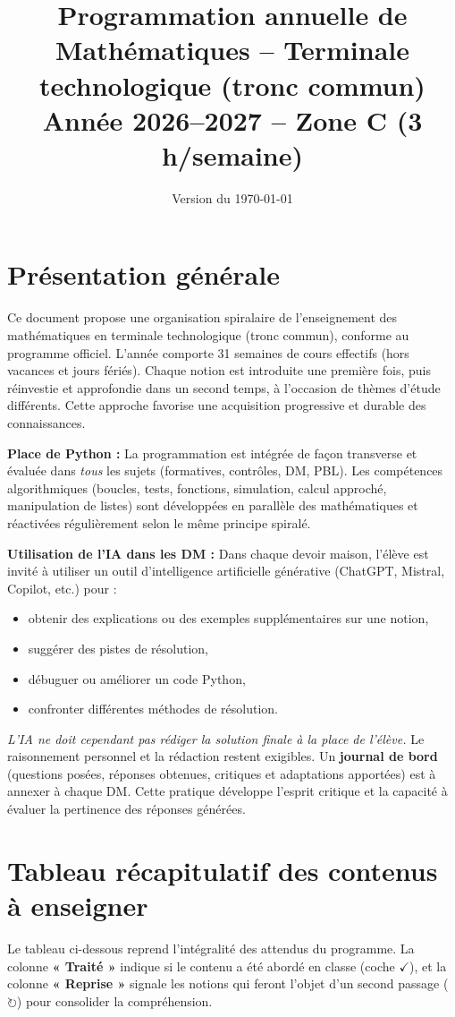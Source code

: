 \documentclass[a4paper,12pt]{article}
\title{Programmation annuelle de Mathématiques -- Terminale technologique (tronc commun) \\
	Année 2026--2027 -- Zone C (3 h/semaine)}
\author{}
\date{Version du \today}
\newcommand{\fait}{\ensuremath{\checkmark}}
\newcommand{\revoit}{\ensuremath{\circlearrowright}}
\begin{document}
	
	\maketitle
	
	\section*{Présentation générale}
	Ce document propose une organisation spiralaire de l’enseignement des mathématiques en terminale technologique (tronc commun), conforme au programme officiel. L’année comporte 31 semaines de cours effectifs (hors vacances et jours fériés). Chaque notion est introduite une première fois, puis réinvestie et approfondie dans un second temps, à l’occasion de thèmes d’étude différents. Cette approche favorise une acquisition progressive et durable des connaissances.
	
	\medskip
	\textbf{Place de Python :} La programmation est intégrée de façon transverse et évaluée dans \emph{tous} les sujets (formatives, contrôles, DM, PBL). Les compétences algorithmiques (boucles, tests, fonctions, simulation, calcul approché, manipulation de listes) sont développées en parallèle des mathématiques et réactivées régulièrement selon le même principe spiralé.
	
	\medskip
	\textbf{Utilisation de l’IA dans les DM :} Dans chaque devoir maison, l’élève est invité à utiliser un outil d’intelligence artificielle générative (ChatGPT, Mistral, Copilot, etc.) pour :
	\begin{itemize}
		\item obtenir des explications ou des exemples supplémentaires sur une notion,
		\item suggérer des pistes de résolution,
		\item débuguer ou améliorer un code Python,
		\item confronter différentes méthodes de résolution.
	\end{itemize}
	\emph{L’IA ne doit cependant pas rédiger la solution finale à la place de l’élève.} Le raisonnement personnel et la rédaction restent exigibles. Un \textbf{journal de bord} (questions posées, réponses obtenues, critiques et adaptations apportées) est à annexer à chaque DM. Cette pratique développe l’esprit critique et la capacité à évaluer la pertinence des réponses générées.
	
	\section{Tableau récapitulatif des contenus à enseigner}
	Le tableau ci-dessous reprend l’intégralité des attendus du programme. La colonne \textbf{« Traité »} indique si le contenu a été abordé en classe (coche \fait), et la colonne \textbf{« Reprise »} signale les notions qui feront l’objet d’un second passage (\revoit) pour consolider la compréhension.
	
\end{document}
